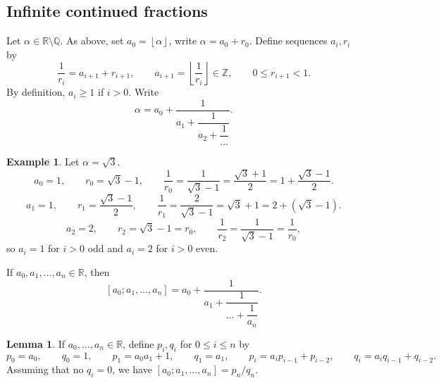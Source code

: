 \documentclass{article}
\newcommand{\Z}{\mathbb{Z}}
\newcommand{\Q}{\mathbb{Q}}
\newcommand{\R}{\mathbb{R}}
\newcommand{\rb}[1]{\left( #1 \right)}
\renewcommand{\sb}[1]{\left[ #1 \right]}
\theoremstyle{definition}\newtheorem{definition}{Definition}
\theoremstyle{definition}\newtheorem{remark}[definition]{Remark}
\theoremstyle{definition}\newtheorem*{example}{Example}
\theoremstyle{definition}\newtheorem*{note}{Note}
\newtheorem{lemma}[definition]{Lemma}
\begin{document}
\subsection{Infinite continued fractions}

Let $ \alpha \in \R \setminus \Q $. As above, set $ a_0 = \left\lfloor \alpha \right\rfloor $, write $ \alpha = a_0 + r_0 $. Define sequences $ a_i, r_i $ by
$$ \dfrac{1}{r_i} = a_{i + 1} + r_{i + 1}, \qquad a_{i + 1} = \left\lfloor \dfrac{1}{r_i} \right\rfloor \in \Z, \qquad 0 \le r_{i + 1} < 1. $$
By definition, $ a_i \ge 1 $ if $ i > 0 $. Write
$$ \alpha = a_0 + \dfrac{1}{a_1 + \dfrac{1}{a_2 + \dfrac{1}{\dots}}}. $$

\begin{example}
Let $ \alpha = \sqrt{3} $.
$$ a_0 = 1, \qquad r_0 = \sqrt{3} - 1, \qquad \dfrac{1}{r_0} = \dfrac{1}{\sqrt{3} - 1} = \dfrac{\sqrt{3} + 1}{2} = 1 + \dfrac{\sqrt{3} - 1}{2}. $$
$$ a_1 = 1, \qquad r_1 = \dfrac{\sqrt{3} - 1}{2}, \qquad \dfrac{1}{r_1} = \dfrac{2}{\sqrt{3} - 1} = \sqrt{3} + 1 = 2 + \rb{\sqrt{3} - 1}. $$
$$ a_2 = 2, \qquad r_2 = \sqrt{3} - 1 = r_0, \qquad \dfrac{1}{r_2} = \dfrac{1}{\sqrt{3} - 1} = \dfrac{1}{r_0}, $$
so $ a_i = 1 $ for $ i > 0 $ odd and $ a_i = 2 $ for $ i > 0 $ even.
\end{example}

If $ a_0, a_1, \dots, a_n \in \R $, then
$$ \sb{a_0; a_1, \dots, a_n} = a_0 + \dfrac{1}{a_1 + \dfrac{1}{\dots + \dfrac{1}{a_n}}}. $$

\begin{lemma}
If $ a_0, \dots, a_n \in \R $, define $ p_i, q_i $ for $ 0 \le i \le n $ by
$$ p_0 = a_0, \qquad q_0 = 1, \qquad p_1 = a_0a_1 + 1, \qquad q_1 = a_1, \qquad p_i = a_ip_{i - 1} + p_{i - 2}, \qquad q_i = a_iq_{i - 1} + q_{i - 2}. $$
Assuming that no $ q_i = 0 $, we have $ \sb{a_0; a_1, \dots, a_n} = p_n / q_n $.
\end{lemma}
\end{document}
